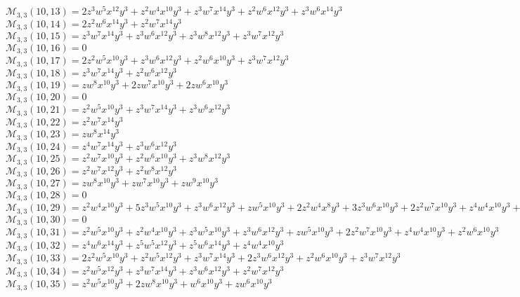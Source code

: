 \documentclass[12pt]{memoireuqam1.3}
\begin{document}
$\mathcal{M}_{3,3}(10,13)=2z^3w^5x^{12}y^3+z^2w^4x^{10}y^3+z^3w^7x^{14}y^3+z^2w^6x^{12}y^3+z^3w^6x^{14}y^3$\\
$\mathcal{M}_{3,3}(10,14)=2z^2w^6x^{14}y^3+z^2w^7x^{14}y^3$\\
$\mathcal{M}_{3,3}(10,15)=z^3w^7x^{14}y^3+z^3w^6x^{12}y^3+z^3w^8x^{12}y^3+z^3w^7x^{12}y^3$\\
$\mathcal{M}_{3,3}(10,16)=0$\\
$\mathcal{M}_{3,3}(10,17)=2z^2w^5x^{10}y^3+z^3w^6x^{12}y^3+z^2w^6x^{10}y^3+z^3w^7x^{12}y^3$\\
$\mathcal{M}_{3,3}(10,18)=z^3w^7x^{14}y^3+z^2w^6x^{12}y^3$\\
$\mathcal{M}_{3,3}(10,19)=zw^8x^{10}y^3+2zw^7x^{10}y^3+2zw^6x^{10}y^3$\\
$\mathcal{M}_{3,3}(10,20)=0$\\
$\mathcal{M}_{3,3}(10,21)=z^2w^5x^{10}y^3+z^3w^7x^{14}y^3+z^3w^6x^{12}y^3$\\
$\mathcal{M}_{3,3}(10,22)=z^2w^7x^{14}y^3$\\
$\mathcal{M}_{3,3}(10,23)=zw^8x^{14}y^3$\\
$\mathcal{M}_{3,3}(10,24)=z^4w^7x^{14}y^3+z^3w^6x^{12}y^3$\\
$\mathcal{M}_{3,3}(10,25)=z^2w^7x^{10}y^3+z^2w^6x^{10}y^3+z^3w^8x^{12}y^3$\\
$\mathcal{M}_{3,3}(10,26)=z^2w^7x^{12}y^3+z^2w^8x^{12}y^3$\\
$\mathcal{M}_{3,3}(10,27)=zw^8x^{10}y^3+zw^7x^{10}y^3+zw^9x^{10}y^3$\\
$\mathcal{M}_{3,3}(10,28)=0$\\
$\mathcal{M}_{3,3}(10,29)=z^2w^4x^{10}y^3+5z^3w^5x^{10}y^3+z^3w^6x^{12}y^3+zw^5x^{10}y^3+2z^2w^4x^8y^3+3z^3w^6x^{10}y^3+2z^2w^7x^{10}y^3+z^4w^4x^{10}y^3+z^2w^5x^8y^3$\\
$\mathcal{M}_{3,3}(10,30)=0$\\
$\mathcal{M}_{3,3}(10,31)=z^2w^5x^{10}y^3+z^2w^4x^{10}y^3+z^3w^5x^{10}y^3+z^3w^6x^{12}y^3+zw^5x^{10}y^3+2z^2w^7x^{10}y^3+z^4w^4x^{10}y^3+z^2w^6x^{10}y^3$\\
$\mathcal{M}_{3,3}(10,32)=z^4w^6x^{14}y^3+z^5w^5x^{12}y^3+z^5w^6x^{14}y^3+z^4w^4x^{10}y^3$\\
$\mathcal{M}_{3,3}(10,33)=2z^2w^5x^{10}y^3+z^2w^5x^{12}y^3+z^3w^7x^{14}y^3+2z^3w^6x^{12}y^3+z^2w^6x^{10}y^3+z^3w^7x^{12}y^3$\\
$\mathcal{M}_{3,3}(10,34)=z^2w^5x^{12}y^3+z^3w^7x^{14}y^3+z^3w^6x^{12}y^3+z^2w^7x^{12}y^3$\\
$\mathcal{M}_{3,3}(10,35)=z^2w^5x^{10}y^3+2zw^8x^{10}y^3+w^6x^{10}y^3+zw^6x^{10}y^3$\\
\end{document}
